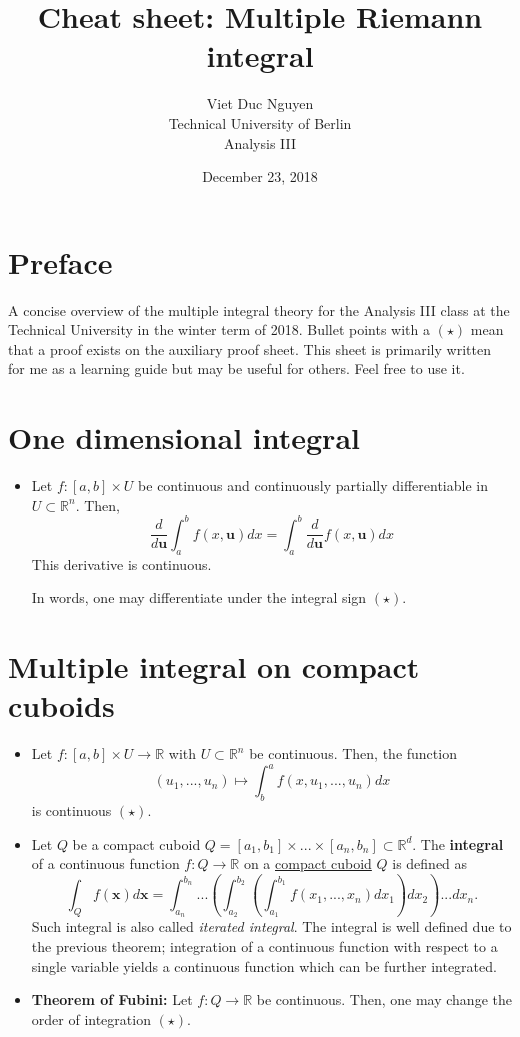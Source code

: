 \documentclass[a4paper, 11pt]{article}
\theoremstyle{plain}
\theoremstyle{definition}
\begin{document}
\title{Cheat sheet: Multiple Riemann integral}
\author{Viet Duc Nguyen\\ Technical University of Berlin\\ Analysis III}
\date{December 23, 2018}
\maketitle
\tableofcontents

\setcounter{section}{-1}
\section{Preface}
A concise overview of the multiple integral theory for the Analysis III class at the Technical University in the winter term of 2018. Bullet points with a $(\star)$ mean that a proof exists on the auxiliary proof sheet. This sheet is primarily written for me as a learning guide but may be useful for others. Feel free to use it.

\section{One dimensional integral}
\begin{itemize}
	\item Let $f: [a,b] \times U$ be continuous and continuously partially differentiable in $U \subset \mathbb R^n$. Then, 
	\[
		\frac{d}{d\mathbf u}\int^b_{a}f(x,\mathbf u) dx = \int^b_a \frac{d}{d\mathbf u}f(x,\mathbf u) dx
	\]
	This derivative is continuous.
	
	In words, one may differentiate under the integral sign $(\star)$.
\end{itemize}

\section{Multiple integral on compact cuboids}
\begin{itemize}
	\item Let $f: [a,b] \times U \to \mathbb R$ with $U \subset \mathbb R^{n}$ be continuous. Then, the function 
	\[
	(u_1,...,u_{n}) \mapsto \int^{a}_b f(x,u_1,...,u_n) dx
	\] 
	is continuous $(\star)$.
	\item Let $Q$ be a compact cuboid $Q = [a_1,b_1] \times ... \times [a_n,b_n] \subset \mathbb R^d.$ The \textbf{integral} of a continuous function $f: Q \to \mathbb R$ on a \underline{compact cuboid} $Q$  is defined as
	\[
		\int_Q f(\mathbf{x})d \mathbf x = \int^{b_n}_{a_n}...\left(\int^{b_2}_{a_2}\left(\int^{b_1}_{a_1} f(x_1,...,x_n) dx_1 \right)dx_2\right)... dx_n.
	\]
	Such integral is also called \emph{iterated integral}. The integral is well defined due to the previous theorem; integration of a continuous function with respect to a single variable yields a continuous function which can be further integrated.
	
	\item \textbf{Theorem of Fubini:} Let $f: Q \to \mathbb R$ be continuous. Then, one may change the order of integration $(\star)$.
\end{itemize}
\end{document}
